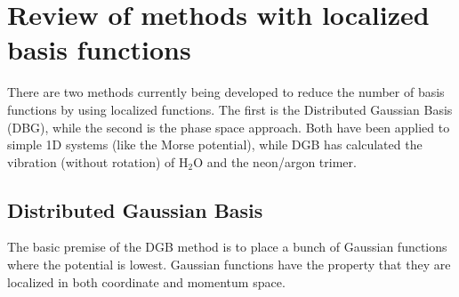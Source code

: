 \section{Review of methods with localized basis functions}
 There are two methods 
currently being developed to reduce the number of basis functions by using localized functions. The first is the 
Distributed Gaussian Basis (DBG)\cite{Hamilton1986}, while the second is the phase space\cite{Davis1979} approach. Both have been 
applied to simple 1D systems (like the Morse potential), while DGB has calculated the vibration (without 
rotation) of H$_2$O and the neon/argon trimer\cite{Garashchuk2001}. 

\subsection{Distributed Gaussian Basis}
The basic premise of the DGB method is to place a bunch of Gaussian functions where the potential is lowest.  Gaussian functions have the property that they are localized in both  coordinate and momentum space.  

